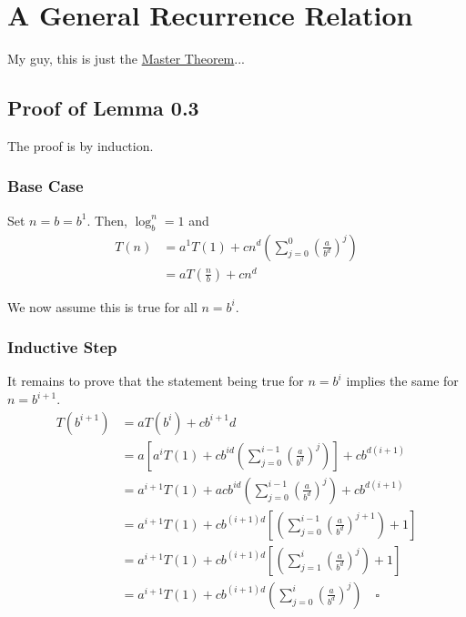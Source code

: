 \documentclass[12pt]{article}
\begin{document}
\section{A General Recurrence Relation}

My guy, this is just the
\href{https://en.wikipedia.org/wiki/Master_theorem_(analysis_of_algorithms)}{Master Theorem}...

\subsection{Proof of Lemma 0.3}

The proof is by induction.

\subsubsection{Base Case}

Set $n=b=b^1$.
Then, $\log_b^n=1$ and
\begin{align*}
    T(n)
     & = a^1T(1)+cn^d\left(\sum_{j=0}^{0}\left(\frac{a}{b^d}\right)^j\right) \\
     & = aT\left(\frac{n}{b}\right)+cn^d
\end{align*}

We now assume this is true for all $n=b^i$.

\subsubsection{Inductive Step}

It remains to prove that the statement being true for $n=b^i$ implies the same for $n=b^{i+1}$.
\begin{align*}
    T\left(b^{i+1}\right)
     & = aT\left(b^i\right)+cb^{i+1}d                                                                         \\
     & = a\left[a^iT(1)+cb^{id}\left(\sum_{j=0}^{i-1} \left(\frac{a}{b^d}\right)^j\right)\right]+cb^{d(i+1)}  \\
     & = a^{i+1}T(1)+acb^{id}\left(\sum_{j=0}^{i-1} \left(\frac{a}{b^d}\right)^j\right)+cb^{d(i+1)}           \\
     & = a^{i+1}T(1)+cb^{(i+1)d}\left[\left(\sum_{j=0}^{i-1} \left(\frac{a}{b^d}\right)^{j+1}\right)+1\right] \\
     & = a^{i+1}T(1)+cb^{(i+1)d}\left[\left(\sum_{j=1}^{i} \left(\frac{a}{b^d}\right)^j\right)+1\right]       \\
     & = a^{i+1}T(1)+cb^{(i+1)d}\left(\sum_{j=0}^{i} \left(\frac{a}{b^d}\right)^j\right)\quad\square
\end{align*}
\end{document}
